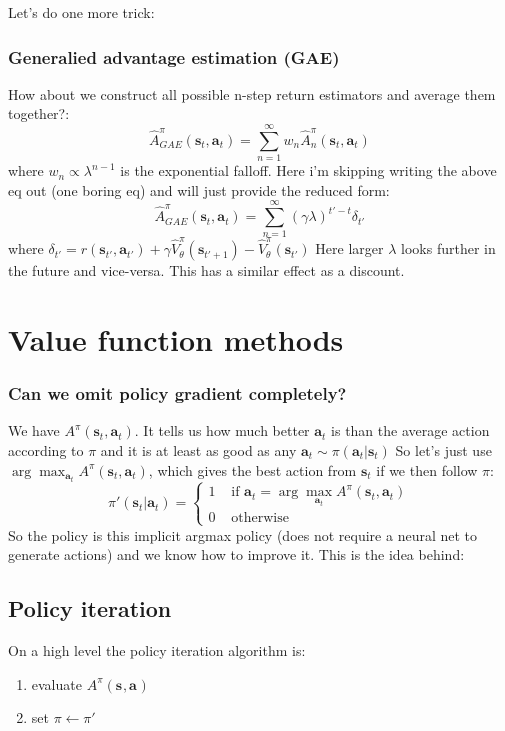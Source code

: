 \documentclass{report}
\newcommand{\argmax}{\arg\!\max}
\begin{document}
Let's do one more trick:
\subsection{Generalied advantage estimation (GAE)}
How about we construct all possible n-step return estimators and average them together?:
\begin{equation}
\hat{A}^\pi_{GAE} (\bm{s}_{t}, \bm{a}_{t}) =
\sum_{n=1}^{\infty} w_n \hat{A}^\pi_n (\bm{s}_{t}, \bm{a}_{t})
\end{equation}
where $w_n \propto \lambda^{n-1}$ is the exponential falloff.
Here i'm skipping writing the above eq out (one boring eq) and will just provide the reduced form:
\begin{equation}
\hat{A}^\pi_{GAE} (\bm{s}_{t}, \bm{a}_{t}) =
\sum_{n=1}^{\infty} (\gamma \lambda)^{t'-t}\delta_{t'}
\end{equation}
where $\delta_{t'} = r(\bm{s}_{t'}, \bm{a}_{t'}) + \gamma \hat{V}^\pi_\theta(\bm{s}_{t'+1})  - \hat{V}^\pi_\theta(\bm{s}_{t'})$
Here larger $\lambda$ looks further in the future and vice-versa.
This has a similar effect as a discount.

\chapter{Value function methods}
\subsection{Can we omit policy gradient completely?}
We have $A^\pi(\bm{s}_{t}, \bm{a}_{t})$.
It tells us how much better $\bm{a}_t$ is than the average action according to $\pi$ 
and it is at least as good as any $\bm{a}_t \sim \pi(\bm{a}_t|\bm{s}_t)$
So let's just use $ \argmax_{\bm{a}_t} A^\pi(\bm{s}_{t}, \bm{a}_{t}) $,
which gives the best action from $\bm{s}_t$ if we then follow $\pi$:
\begin{equation}
		\pi'(\bm{s}_{t}| \bm{a}_{t}) = \left\{ 
\begin{matrix}
		1 & \text{ if } \bm{a}_t = \argmax_{\bm{a}_t} A^\pi (\bm{s}_{t}, \bm{a}_{t}) 		 \\
		0 & \text{ otherwise}
\end{matrix}
		\right.
\end{equation}
So the policy is this implicit argmax policy (does not require a neural net to generate actions)
and we know how to improve it.
This is the idea behind:

\section{Policy iteration}
On a high level the policy iteration algorithm is:
\begin{enumerate}
		\item evaluate $A^\pi (\bm{s}_{}, \bm{a}_{}) $
		\item set $\pi \leftarrow \pi'$
\end{enumerate}
\end{document}

